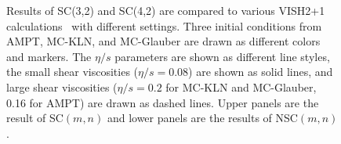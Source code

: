 \begin{figure}[h]
\begin{center}
        \caption{Results of  SC(3,2) and SC(4,2) are compared to various VISH2+1 calculations~\cite{Zhu:2016puf} with different settings. Three initial conditions from AMPT, MC-KLN, and MC-Glauber  are drawn as different colors and markers. The $\eta/s$ parameters are shown as different line styles, the small shear viscosities ($\eta/s=0.08$) are shown as solid lines, and large shear viscosities ($\eta/s=0.2$ for MC-KLN and MC-Glauber, 0.16 for AMPT) are drawn as dashed lines. Upper panels are the result of SC$(m,n)$ and lower panels are the results of NSC$(m,n)$.}
         \label{fig:Figure_3}
        \end{center}   
 \end{figure}
 
